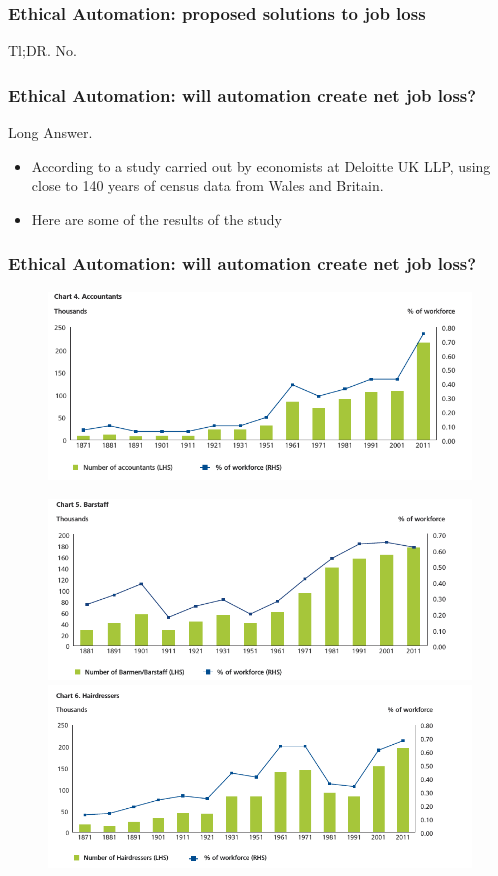 \begin{frame}
  \frametitle{Ethical Automation: proposed solutions to job loss}
  {\Large Tl;DR. No.}
\end{frame}
\begin{frame}
  \frametitle{Ethical Automation: will automation create net job loss? }
  {\Large Long Answer.}
  \begin{itemize}
    \item According to a study carried out by economists at Deloitte UK LLP, using close to 140 years of census data from Wales and Britain.
    \item Here are some of the results of the study
  \end{itemize}
\end{frame}
\begin{frame}
  \frametitle{Ethical Automation: will automation create net job loss? }
  \begin{figure}[th]
    \centering
    \includegraphics[scale=0.3]{diagrams/accountants-growth}
  \end{figure}
  \begin{figure}[h]
    \includegraphics[scale=0.3]{diagrams/barstaff-growth}
    \includegraphics[scale=0.3]{diagrams/hairdressers-growth}
  \end{figure}
\end{frame}

